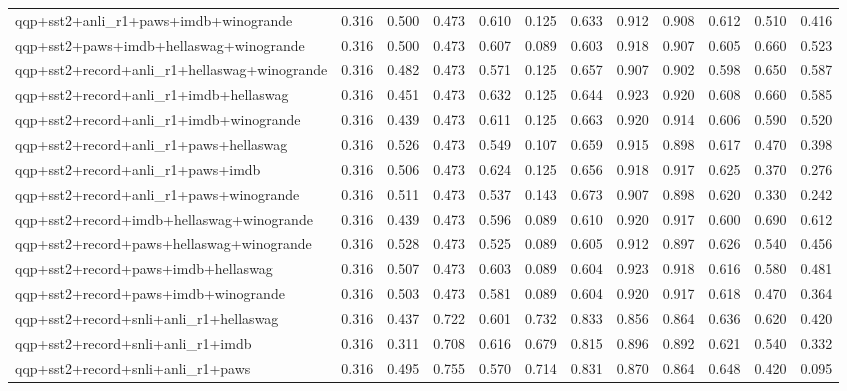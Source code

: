 \begin{table}[t]
\begin{tabular}{lrrrrrrrrrrr}
    qqp+sst2+anli\_r1+paws+imdb+winogrande & 0.316 & 0.500 & 0.473 & 0.610 & 0.125 & 0.633 & 0.912 & 0.908 & 0.612 & 0.510 & 0.416 \\
    qqp+sst2+paws+imdb+hellaswag+winogrande & 0.316 & 0.500 & 0.473 & 0.607 & 0.089 & 0.603 & 0.918 & 0.907 & 0.605 & 0.660 & 0.523 \\
    qqp+sst2+record+anli\_r1+hellaswag+winogrande & 0.316 & 0.482 & 0.473 & 0.571 & 0.125 & 0.657 & 0.907 & 0.902 & 0.598 & 0.650 & 0.587 \\
    qqp+sst2+record+anli\_r1+imdb+hellaswag & 0.316 & 0.451 & 0.473 & 0.632 & 0.125 & 0.644 & 0.923 & 0.920 & 0.608 & 0.660 & 0.585 \\
    qqp+sst2+record+anli\_r1+imdb+winogrande & 0.316 & 0.439 & 0.473 & 0.611 & 0.125 & 0.663 & 0.920 & 0.914 & 0.606 & 0.590 & 0.520 \\
    qqp+sst2+record+anli\_r1+paws+hellaswag & 0.316 & 0.526 & 0.473 & 0.549 & 0.107 & 0.659 & 0.915 & 0.898 & 0.617 & 0.470 & 0.398 \\
    qqp+sst2+record+anli\_r1+paws+imdb & 0.316 & 0.506 & 0.473 & 0.624 & 0.125 & 0.656 & 0.918 & 0.917 & 0.625 & 0.370 & 0.276 \\
    qqp+sst2+record+anli\_r1+paws+winogrande & 0.316 & 0.511 & 0.473 & 0.537 & 0.143 & 0.673 & 0.907 & 0.898 & 0.620 & 0.330 & 0.242 \\
    qqp+sst2+record+imdb+hellaswag+winogrande & 0.316 & 0.439 & 0.473 & 0.596 & 0.089 & 0.610 & 0.920 & 0.917 & 0.600 & 0.690 & 0.612 \\
    qqp+sst2+record+paws+hellaswag+winogrande & 0.316 & 0.528 & 0.473 & 0.525 & 0.089 & 0.605 & 0.912 & 0.897 & 0.626 & 0.540 & 0.456 \\
    qqp+sst2+record+paws+imdb+hellaswag & 0.316 & 0.507 & 0.473 & 0.603 & 0.089 & 0.604 & 0.923 & 0.918 & 0.616 & 0.580 & 0.481 \\
    qqp+sst2+record+paws+imdb+winogrande & 0.316 & 0.503 & 0.473 & 0.581 & 0.089 & 0.604 & 0.920 & 0.917 & 0.618 & 0.470 & 0.364 \\
    qqp+sst2+record+snli+anli\_r1+hellaswag & 0.316 & 0.437 & 0.722 & 0.601 & 0.732 & 0.833 & 0.856 & 0.864 & 0.636 & 0.620 & 0.420 \\
    qqp+sst2+record+snli+anli\_r1+imdb & 0.316 & 0.311 & 0.708 & 0.616 & 0.679 & 0.815 & 0.896 & 0.892 & 0.621 & 0.540 & 0.332 \\
    qqp+sst2+record+snli+anli\_r1+paws & 0.316 & 0.495 & 0.755 & 0.570 & 0.714 & 0.831 & 0.870 & 0.864 & 0.648 & 0.420 & 0.095 \\

\end{tabular}
\end{table}
